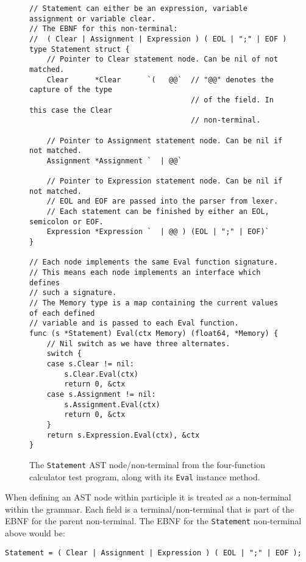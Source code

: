 \begin{figure}[H]
    \begin{verbatim}
// Statement can either be an expression, variable assignment or variable clear.
// The EBNF for this non-terminal:
//  ( Clear | Assignment | Expression ) ( EOL | ";" | EOF )
type Statement struct {
    // Pointer to Clear statement node. Can be nil of not matched.
    Clear      *Clear      `(   @@`  // "@@" denotes the capture of the type 
                                     // of the field. In this case the Clear
                                     // non-terminal.

    // Pointer to Assignment statement node. Can be nil if not matched.
    Assignment *Assignment `  | @@`

    // Pointer to Expression statement node. Can be nil if not matched.
    // EOL and EOF are passed into the parser from lexer.
    // Each statement can be finished by either an EOL, semicolon or EOF.
    Expression *Expression `  | @@ ) (EOL | ";" | EOF)`
}

// Each node implements the same Eval function signature.
// This means each node implements an interface which defines
// such a signature.
// The Memory type is a map containing the current values of each defined
// variable and is passed to each Eval function.
func (s *Statement) Eval(ctx Memory) (float64, *Memory) {
    // Nil switch as we have three alternates.
    switch {
    case s.Clear != nil:
        s.Clear.Eval(ctx)
        return 0, &ctx
    case s.Assignment != nil:
        s.Assignment.Eval(ctx)
        return 0, &ctx
    }
    return s.Expression.Eval(ctx), &ctx
}
    \end{verbatim}
    \label{fig:four-func-calc-statement-ast-node}
    \cprotect\caption{The \verb|Statement| AST node/non-terminal from the four-function calculator test program, along with its \verb|Eval| instance method.}
\end{figure}

When defining an AST node within participle it is treated as a non-terminal within the grammar. Each field is a terminal/non-terminal that is part of the EBNF for the parent non-terminal. The EBNF for the \verb|Statement| non-terminal above would be:

\begin{verbatim}
Statement = ( Clear | Assignment | Expression ) ( EOL | ";" | EOF );
\end{verbatim}

